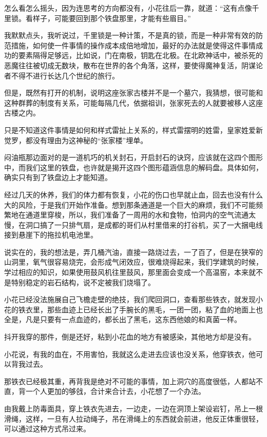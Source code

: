 怎么看怎么摇头，因为连思考的方向都没有，小花往后一靠，就道：“这有点像千里锁。看样子，可能要回到那个铁盘那里，才能有些眉目。”

我默默点头，我听说过，千里锁是一种计策，不是真的锁，而是一种非常有效的防范措施，如何使一件事情的操作成本成倍地增加，最好的办法就是使得这件事情成功的要素隔得足够远，比如说，门在南极，钥匙在北极。在北欧神话中，被杀死的恶魔往往被切成无数块，散布在世界的各个角落，这样，要使得魔神复活，阴谋论者不得不进行长达几个世纪的旅行。

但是，既然有打开的机制，说明这座张家古楼并不是一个墓穴，我猜想，很可能和这种群葬的制度有关系，可能每隔几代，依据祖训，张家死去的人就要被移人这座古楼之内。

只是不知道这件事情是如何和样式雷扯上关系的，样式雷摆明的姓雷，皇家姓爱新觉罗，都没有理由为这神秘的“张家楼”埋单。

闷油瓶那边面对的是一道机巧的机关封石，开启封石的诀窍，应该就在这四个图形中，而我们这里的铁盘，也许就是揭开这四个图形蕴涵信息的解码盘。具体如何，确实只有到了铁盘边上才能知道。

经过几天的休养，我们的体力都有恢复，小花的伤口也早就止血，回去也没有什么大的风险，于是我们开始作准备。想到那条通道是一个巨大的麻烦，我们不可能频繁地在通道里穿梭，所以，我们准备了一周用的水和食物，怕洞内的空气流通太慢，在洞口搞了一只排气扇，是成都的哥们从村里借来的打谷机，买了一大捆电线接到悬崖下的拖拉机电池里。

说实在的，我的想法是，弄几桶汽油，直接一路烧过去，一了百了，但是在狭窄的山洞里，氧气很容易烧完，会形成气闭效应，很难烧得起来，我们学建筑的时候，学过相应的知识，如果使用鼓风机往里鼓风，那里面会变成一个高温窑，本来就不是特别稳定的岩石结构，说不定被我们烧塌了。

小花已经没法施展自己飞檐走壁的绝技，我们爬回洞口，查看那些铁衣，就发现小花的铁衣里，那些血迹上已经长出了手腕长的黑毛，一团一团，粘了血的地面上也全是，凡是只要有一点血迹的，都长出了黑毛，这东西他娘的和真菌一样。

抖开我穿的那件，倒是还好，粘到小花血的地方有被感染，其他地方却是没有。

小花说，有我的血在，不用害怕，我就这么走进去应该也没关系，他穿铁衣，他可以背我过去。

那铁衣已经极其重，再背我是绝对不可能的事情，加上洞穴的高度很低，人都站不直，背一个人更加的够戗，合计来合计去，小花想了一个办法。

由我戴上防毒面具，穿上铁衣先进去，一边走，一边在洞顶上架设岩钉，吊上一根滑绳，这样，一旦有人拉动绳子，吊在滑绳上的东西就会前进，他反正体重很轻，可以通过这种方式吊过来。

